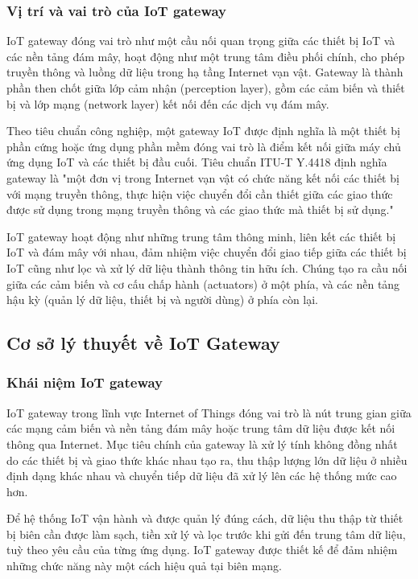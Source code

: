         \subsubsection{Vị trí và vai trò của IoT gateway}
            IoT gateway đóng vai trò như một cầu nối quan trọng giữa các thiết bị IoT và các nền tảng đám mây, hoạt động như một trung tâm điều phối chính, cho phép truyền thông và luồng dữ liệu trong hạ tầng Internet vạn vật. Gateway là thành phần then chốt giữa lớp cảm nhận (perception layer), gồm các cảm biến và thiết bị và lớp mạng (network layer) kết nối đến các dịch vụ đám mây.

            Theo tiêu chuẩn công nghiệp, một gateway IoT được định nghĩa là một thiết bị phần cứng hoặc ứng dụng phần mềm đóng vai trò là điểm kết nối giữa máy chủ ứng dụng IoT và các thiết bị đầu cuối. Tiêu chuẩn ITU-T Y.4418 định nghĩa gateway là "một đơn vị trong Internet vạn vật có chức năng kết nối các thiết bị với mạng truyền thông, thực hiện việc chuyển đổi cần thiết giữa các giao thức được sử dụng trong mạng truyền thông và các giao thức mà thiết bị sử dụng."

            IoT gateway hoạt động như những trung tâm thông minh, liên kết các thiết bị IoT và đám mây với nhau, đảm nhiệm việc chuyển đổi giao tiếp giữa các thiết bị IoT cũng như lọc và xử lý dữ liệu thành thông tin hữu ích. Chúng tạo ra cầu nối giữa các cảm biến và cơ cấu chấp hành (actuators) ở một phía, và các nền tảng hậu kỳ (quản lý dữ liệu, thiết bị và người dùng) ở phía còn lại.
    \subsection{Cơ sở lý thuyết về IoT Gateway}
        \subsubsection{Khái niệm IoT gateway}
            IoT gateway trong lĩnh vực Internet of Things đóng vai trò là nút trung gian giữa các mạng cảm biến và nền tảng đám mây hoặc trung tâm dữ liệu được kết nối thông qua Internet. Mục tiêu chính của gateway là xử lý tính không đồng nhất do các thiết bị và giao thức khác nhau tạo ra, thu thập lượng lớn dữ liệu ở nhiều định dạng khác nhau và chuyển tiếp dữ liệu đã xử lý lên các hệ thống mức cao hơn.

            Để hệ thống IoT vận hành và được quản lý đúng cách, dữ liệu thu thập từ thiết bị biên cần được làm sạch, tiền xử lý và lọc trước khi gửi đến trung tâm dữ liệu, tuỳ theo yêu cầu của từng ứng dụng. IoT gateway được thiết kế để đảm nhiệm những chức năng này một cách hiệu quả tại biên mạng.

